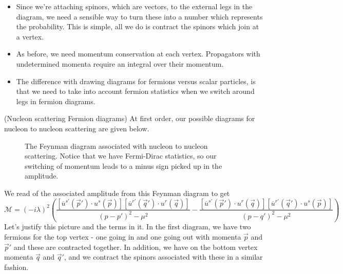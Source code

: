 \begin{itemize}
need to move consistently throughout the diagram. 
This reflects fermion number conservation.
\item Since we're attaching spinors, which are vectors, 
	to the external legs in the diagram, we need a sensible 
	way to turn these into a number which represents the probability. 
	This is simple, all we do is contract the spinors which 
	join at a vertex. 
\item As before, we need momentum conservation at each vertex. 
Propagators with undetermined momenta require an 
integral over their momentum. 
\item The difference with drawing diagrams 
for fermions versus scalar particles, is 
that we need to take into account fermion statistics when 
we switch around legs in fermion diagrams. 
\end{itemize} 

\begin{example}{(Nucleon scattering Fermion diagrams)} 
At first order, our possible diagrams 
for nucleon to nucleon scattering are given 
below. 
\begin{figure}[htpb]
	\centering
	
	\caption{The Feynman diagram associated with nucleon to nucleon scattering. 
	Notice that we have Fermi-Dirac statistics, so our switching of momentum 
leads to a minus sign picked up in the amplitude. }%
	\label{fig:}
\end{figure}
We read of the associated amplitude from this Feynman diagram 
to get 
\[
	\mathcal{ M } = ( - i \lambda ) ^ 2 \left( 
	\frac{\left[  \overline{ u } ^{ s' } ( \vec{p} ' ) \cdot  u ^ s ( \vec{p} )  \right] \left[ 
\overline{ u } ^{ r' } \left( \vec{q} '  \right)  \cdot  u ^ r (\vec{q} ) \right]  }{ \left( p - p '  \right)  ^ 2 - \mu ^ 2 } 
 - \frac{ \left[  \overline{ u } ^{ s' } \left( \vec{p} ' \right)  \cdot  u ^ r ( \vec{q} )  \right] \left[ 
		 \overline{ u } ^{ r' } ( \vec{q} ') \cdot  u^{ s } ( \vec{p} )  \right]  }{  \left( p - q'  \right)  ^ 2 
 - \mu ^ 2 }\right)  
	\] 
	Let's justify this 
	picture and the terms in it. In the first diagram, 
	we have two fermions for the top vertex - one going in and 
	one going out with momenta $ \vec{p} $ and $ \vec{p} ' $ 
	and these are contracted together. 
	In addition, we have on the bottom vertex 
	momenta $ \vec{q} $ and  $ \vec{q} ' $, and 
	we contract the spinors associated with these in a similar fashion. 
\end{example}

